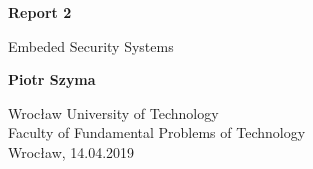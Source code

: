 \begin{titlepage}
  \begin{center}
      \vspace*{1cm}

      \textbf{Report 2}

      \vspace{0.5cm}
       Embeded Security Systems

      \vspace{1.5cm}

      \textbf{Piotr Szyma}

      \vfill

      \vspace{0.8cm}

      Wrocław University of Technology\\
      Faculty of Fundamental Problems of Technology\\
      Wrocław, 14.04.2019

  \end{center}
\end{titlepage}